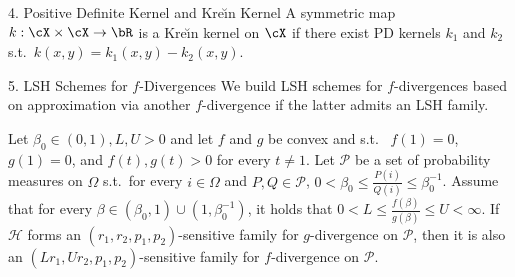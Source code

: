 \documentclass[final]{beamer}
\newcommand{\kr}{Kre\u{\i}n\xspace}
\newlength{\onecolwid}
\begin{document}
\begin{frame}[t]
\begin{columns}[t]
\begin{column}{\onecolwid}
\begin{block}{4. Positive Definite Kernel and \kr Kernel}
	\structure{\textbf{\kr kernel.
	}}
		A symmetric
		 map $ 
		k:\cX\times\cX\to \bR $ is a \kr kernel on $ \cX $ if there exist 
		PD kernels $ k_1 $ and $ k_2 $ s.t.\ $ 
		k(x,y)=k_1(x,y)-k_2(x,y) $.

\end{block}

\begin{block}{5. LSH Schemes for $ f $-Divergences}
	We build LSH schemes for $ f $-divergences based on approximation via 
	another $ 
	f $-divergence if the latter admits an LSH family. 
	
	
	
	
	
	Let $ \beta_0\in (0,1),L,U>0 $ and let $ f $ and $ g $ be convex and s.t.\
	 $ f(1)=0 $, $ g(1)=0 $, and $f(t), g(t)>0 $ for every $ 
	t\ne 1 
	$. 
	Let $ \mathcal{P} $ be a set of probability measures
	on 
	 $ \Omega $ s.t.\ for every $ i\in 
	\Omega $ and $ 
	P, Q\in \mathcal{P} $, $
	0< \beta_0\le \frac{P(i)}{Q(i)} \le \beta_0^{-1}
	$.
	Assume that for every $ \beta\in 
	(\beta_0, 1)\cup (1,\beta_0^{-1}) $, it holds that
	$
	0<L\le \frac{f(\beta)}{g(\beta)} \le U < \infty$.
	If $ \mathcal{H} $ forms 
	an $ (r_1, r_2, p_1,p_2) $-sensitive family for $ 
	g 
	$-divergence on $ \mathcal{P} $, then it is also an  
	$ (Lr_1, 
	Ur_2, p_1,p_2)  
	$-sensitive family for $ f $-divergence on $ \mathcal{P} $.
	

\end{block}
\end{column}
\end{columns}
\end{frame}
\end{document}
